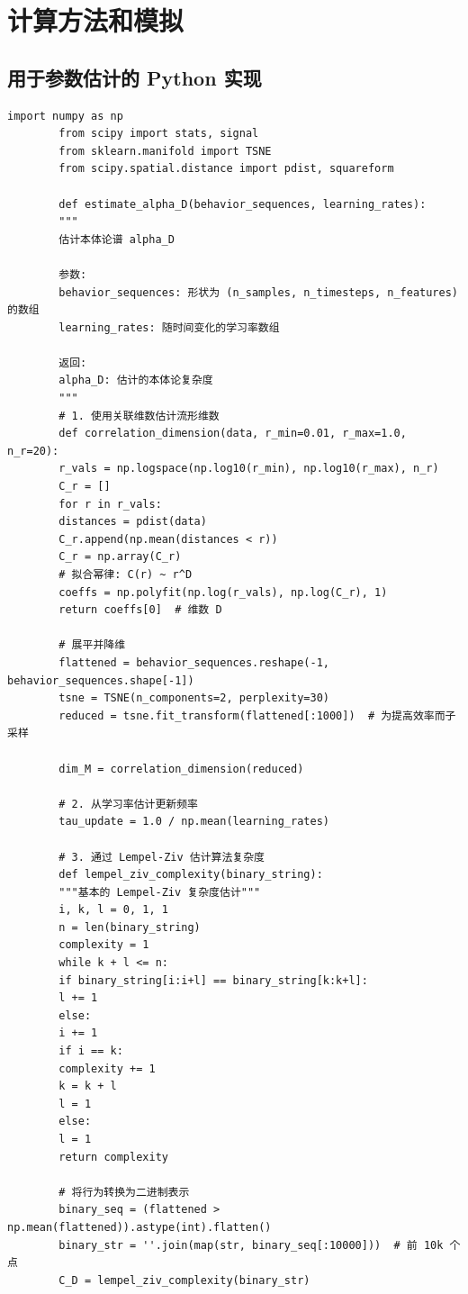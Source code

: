 \documentclass[11pt,a4paper]{article}
\begin{document}
	\section{计算方法和模拟}
	
	\subsection{用于参数估计的 Python 实现}
	
	\begin{lstlisting}[caption={从时间序列数据估计 UCD 参数的 Python 代码}, label={lst:ucd-python}]
		import numpy as np
		from scipy import stats, signal
		from sklearn.manifold import TSNE
		from scipy.spatial.distance import pdist, squareform
		
		def estimate_alpha_D(behavior_sequences, learning_rates):
		"""
		估计本体论谱 alpha_D
		
		参数:
		behavior_sequences: 形状为 (n_samples, n_timesteps, n_features) 的数组
		learning_rates: 随时间变化的学习率数组
		
		返回:
		alpha_D: 估计的本体论复杂度
		"""
		# 1. 使用关联维数估计流形维数
		def correlation_dimension(data, r_min=0.01, r_max=1.0, n_r=20):
		r_vals = np.logspace(np.log10(r_min), np.log10(r_max), n_r)
		C_r = []
		for r in r_vals:
		distances = pdist(data)
		C_r.append(np.mean(distances < r))
		C_r = np.array(C_r)
		# 拟合幂律: C(r) ~ r^D
		coeffs = np.polyfit(np.log(r_vals), np.log(C_r), 1)
		return coeffs[0]  # 维数 D
		
		# 展平并降维
		flattened = behavior_sequences.reshape(-1, behavior_sequences.shape[-1])
		tsne = TSNE(n_components=2, perplexity=30)
		reduced = tsne.fit_transform(flattened[:1000])  # 为提高效率而子采样
		
		dim_M = correlation_dimension(reduced)
		
		# 2. 从学习率估计更新频率
		tau_update = 1.0 / np.mean(learning_rates)
		
		# 3. 通过 Lempel-Ziv 估计算法复杂度
		def lempel_ziv_complexity(binary_string):
		"""基本的 Lempel-Ziv 复杂度估计"""
		i, k, l = 0, 1, 1
		n = len(binary_string)
		complexity = 1
		while k + l <= n:
		if binary_string[i:i+l] == binary_string[k:k+l]:
		l += 1
		else:
		i += 1
		if i == k:
		complexity += 1
		k = k + l
		l = 1
		else:
		l = 1
		return complexity
		
		# 将行为转换为二进制表示
		binary_seq = (flattened > np.mean(flattened)).astype(int).flatten()
		binary_str = ''.join(map(str, binary_seq[:10000]))  # 前 10k 个点
		C_D = lempel_ziv_complexity(binary_str)
		

\end{lstlisting}
\end{document}
